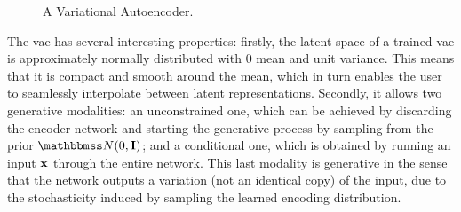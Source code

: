 \begin{figure*}[h!]
    \centering
    \resizebox{.75\textwidth}{!}{}
    \caption{A Variational Autoencoder.}
    \label{fig:vae}
\end{figure*}
The \gls{vae} has several interesting properties: firstly, the latent space of a trained \gls{vae} is approximately normally distributed with 0 mean and unit variance. This means that it is compact and smooth around the mean, which in turn enables the user to seamlessly interpolate between latent representations. Secondly, it allows two generative modalities: an unconstrained one, which can be achieved by discarding the encoder network and starting the generative process by sampling from the prior $\Normal{0}{\Matrix{I}}$; and a conditional one, which is obtained by running an input $\Vector{x}$ through the entire network. This last modality is generative in the sense that the network outputs a variation (not an identical copy) of the input, due to the stochasticity induced by sampling the learned encoding distribution.